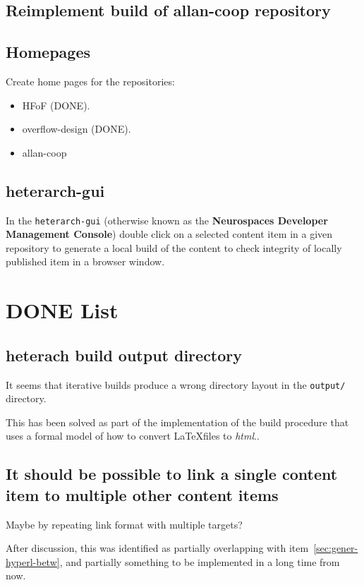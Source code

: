 \documentclass[12pt]{article}
\begin{document}
\subsection{Reimplement build of allan-coop repository}


\subsection{Homepages}

Create home pages for the repositories:
\begin{itemize}
\item HFoF (DONE).
\item overflow-design (DONE).
\item allan-coop
\end{itemize}


\subsection{heterarch-gui}

In the {\tt heterarch-gui} (otherwise known as the {\bf Neurospaces
  Developer Management Console}) double click on a selected content
item in a given repository to generate a local build of the content to
check integrity of locally published item in a browser window.


\section{DONE List}

\subsection{heterach build output directory}

It seems that iterative builds produce a wrong directory layout in the
{\tt output/} directory.

This has been solved as part of the implementation of the build
procedure that uses a formal model of how to convert \LaTeX files to
{\it html}..


\subsection{It should be possible to link a single content item to multiple other content items}
Maybe by repeating link format with multiple targets?

After discussion, this was identified as partially overlapping with
item~\ref{sec:gener-hyperl-betw}, and partially something to be
implemented in a long time from now.
\end{document}

